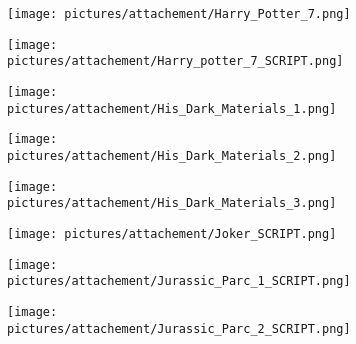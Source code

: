 \begin{figure} \ContinuedFloat
        \centering
        \begin{subfigure}{.49\textwidth}
                \centering
                \texttt{[image: pictures/attachement/Harry\_Potter\_7.png]}
        \end{subfigure}
        \begin{subfigure}{.49\textwidth}
                \centering
                \texttt{[image: pictures/attachement/Harry\_potter\_7\_SCRIPT.png]}
        \end{subfigure}
\end{figure}
\begin{figure} \ContinuedFloat
        \centering
        \begin{subfigure}{.49\textwidth}
                \centering
                \texttt{[image: pictures/attachement/His\_Dark\_Materials\_1.png]}
        \end{subfigure}
        \begin{subfigure}{.49\textwidth}
                \centering
                \texttt{[image: pictures/attachement/His\_Dark\_Materials\_2.png]}
        \end{subfigure}
\end{figure}
\begin{figure} \ContinuedFloat
        \centering
        \begin{subfigure}{.49\textwidth}
                \centering
                \texttt{[image: pictures/attachement/His\_Dark\_Materials\_3.png]}
        \end{subfigure}
        \begin{subfigure}{.49\textwidth}
                \centering
                \texttt{[image: pictures/attachement/Joker\_SCRIPT.png]}
        \end{subfigure}
\end{figure}
\begin{figure} \ContinuedFloat
        \centering
        \begin{subfigure}{.49\textwidth}
                \centering
                \texttt{[image: pictures/attachement/Jurassic\_Parc\_1\_SCRIPT.png]}
        \end{subfigure}
        \begin{subfigure}{.49\textwidth}
                \centering
                \texttt{[image: pictures/attachement/Jurassic\_Parc\_2\_SCRIPT.png]}
        \end{subfigure}
\end{figure}
